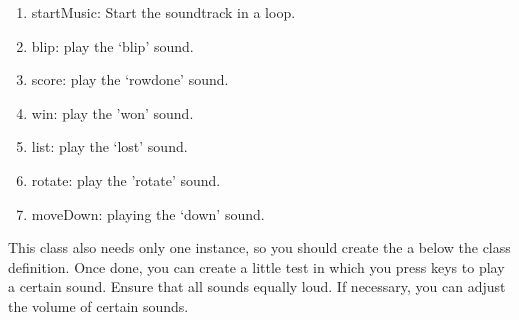 \begin{enumerate}
  \item startMusic: Start the soundtrack in a loop.
	\item blip: play the `blip' sound.
	\item score: play the `rowdone' sound.
	\item win: play the 'won' sound.
	\item list: play the `lost' sound.
	\item rotate: play the 'rotate' sound.
	\item moveDown: playing the `down' sound.
\end{enumerate}

This class also needs only one instance, so you should create the a  below the class definition. Once done, you can create a little test in which you press keys to play a certain sound. Ensure that all sounds equally loud. If necessary, you can adjust the volume of certain sounds.

